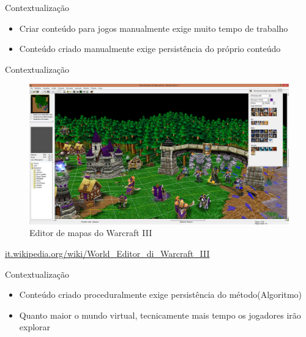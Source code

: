 
\begin{frame}{Contextualização}
  \begin{itemize}
        \item Criar conteúdo para jogos manualmente exige muito tempo de trabalho
        \item Conteúdo criado manualmente exige persistência do próprio conteúdo
    \end{itemize}
\end{frame}

\begin{frame}{Contextualização}
    \begin{figure}
		\centering
        \includegraphics[width=.8\textwidth]{img/intro/World_Editor_di_Warcraft_III.jpg}
        \caption{Editor de mapas do \alert{Warcraft III}}
    \end{figure}
    \url{it.wikipedia.org/wiki/World_Editor_di_Warcraft_III}
\end{frame}

\begin{frame}{Contextualização}
    \begin{itemize}
        \item Conteúdo criado proceduralmente exige persistência do método(Algoritmo)
        \item Quanto maior o mundo virtual, tecnicamente mais tempo os jogadores irão explorar \cite{bevilacqua2009ferramenta}
    \end{itemize}
\end{frame}


